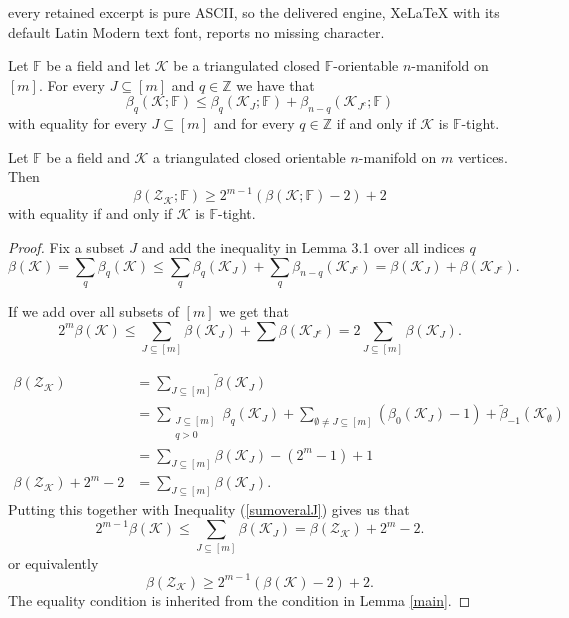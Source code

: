\documentclass[10pt,a4paper]{amsart}
\def\F{\mathbb{F}}
\def\J{{J^c}}
\def\K{\mathcal{K}}
\def\ZZ{\mathcal{Z}}
\def\Z{\mathbb{Z}}    %
\begin{document}
every retained excerpt is pure ASCII, so the delivered engine, XeLaTeX with its default Latin Modern text font, reports no missing character.
\begin{lem}\label{main}
    Let $\F$ be a field and let $\K$ be a triangulated closed $\F$-orientable $n$-manifold on $[m]$. For every $J\subseteq [m]$ and $q\in \Z$ we have that 
    \[\beta_q(\K;\F)\leq \beta_q(\K_{J};\F)+ \beta_{n-q}(\K_{{J^c}};\F)\]
    with equality for every $J\subseteq [m]$ and for every $q\in\Z$ if and only if $\K$ is $\F$-tight. 
\end{lem}

\begin{thm}\label{truemain}
    Let $\F$ be a field and $\K$ a triangulated closed orientable $n$-manifold on $m$ vertices. Then
    \[\beta(\ZZ_\K;\F)\geq2^{m-1}(\beta(\K;\F)-2)+2\]
    with equality if and only if $\K$ is $\F$-tight.
\end{thm}

\begin{proof}
    Fix a subset $J$ and add the inequality in Lemma 3.1 over all indices $q$
    \[\beta(\K)=\sum_q\beta_q(\K)\leq \sum_q\beta_q(\K_J)+\sum_q\beta_{n-q}(\K_{\J})=\beta(\K_J)+\beta(\K_\J).\]
    
    If we add over all subsets of $[m]$ we get that
    \begin{equation}\label{sumoveralJ}
        2^m\beta(\K)\leq\sum_{J\subseteq[m]}\beta(\K_J)+\sum\beta(\K_\J)=2\sum_{J\subseteq[m]}\beta(\K_J).
    \end{equation}

    \begin{align*}
    \beta(\ZZ_\K)&=\sum_{J\subseteq[m]}\tilde{\beta}(\K_J)\\
        	       &=\sum_{\substack{J\subseteq[m]\\q>0}}\beta_q(\K_J)+\sum_{\emptyset\neq J\subseteq[m]}(\beta_0(\K_J)-1)+\tilde{\beta}_{-1}(\K_\emptyset)\\
                   &=\sum_{J\subseteq[m]}\beta(\K_J)-(2^{m}-1)+1\\
                   \beta(\ZZ_\K)+2^m-2&=\sum_{J\subseteq[m]}\beta(\K_J).    
    \end{align*}
    Putting this together with Inequality (\ref{sumoveralJ}) gives us that 
    \[2^{m-1}\beta(\K)\leq\sum_{J\subseteq[m]}\beta(\K_J)=\beta(\ZZ_\K)+2^m-2.\]
    or equivalently
    \[\beta(\ZZ_\K)\geq 2^{m-1}(\beta(\K)-2)+2.\]
    The equality condition is inherited from the condition in Lemma \ref{main}.
\end{proof}
\end{document}
